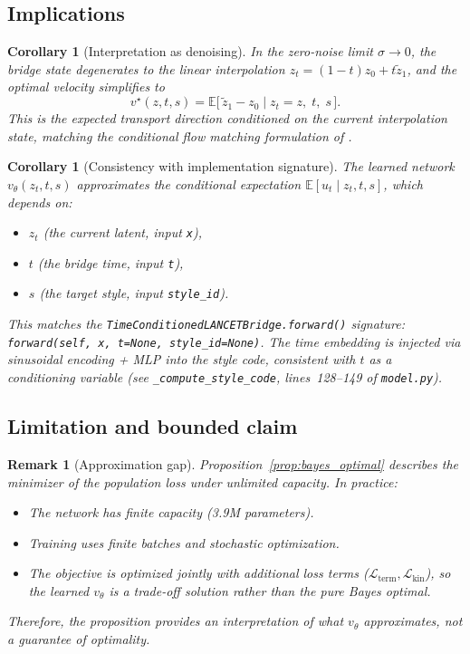 \documentclass[letterpaper]{article}
\newtheorem{corollary}[proposition]{Corollary}
\newtheorem{remark}[proposition]{Remark}
\newcommand{\E}{\mathbb{E}}
\newcommand{\cL}{\mathcal{L}}
\begin{document}
\subsection{Implications}

\begin{corollary}[Interpretation as denoising]
\label{cor:denoising}
In the zero-noise limit $\sigma \to 0$, the bridge state degenerates to
the linear interpolation $z_t = (1-t)z_0 + t\tilde z_1$, and the optimal
velocity simplifies to
\begin{equation}
    v^\star(z, t, s) = \E\bigl[\, \tilde z_1 - z_0 \mid z_t = z,\; t,\; s \,\bigr].
\end{equation}
This is the expected transport direction conditioned on the current
interpolation state, matching the conditional flow matching formulation
of \cite{lipman2022flow}.
\end{corollary}

\begin{corollary}[Consistency with implementation signature]
\label{cor:implementation}
The learned network $v_\theta(z_t, t, s)$ approximates the conditional
expectation $\E[u_t \mid z_t, t, s]$, which depends on:
\begin{itemize}[nosep]
    \item $z_t$ (the current latent, input \texttt{x}),
    \item $t$ (the bridge time, input \texttt{t}),
    \item $s$ (the target style, input \texttt{style\_id}).
\end{itemize}
This matches the \texttt{TimeConditionedLANCETBridge.forward()} signature:
\texttt{forward(self, x, t=None, style\_id=None)}.
The time embedding is injected via sinusoidal encoding + MLP into the
style code, consistent with $t$ as a conditioning variable (see
\texttt{\_compute\_style\_code}, lines~128--149 of \texttt{model.py}).
\end{corollary}

\subsection{Limitation and bounded claim}

\begin{remark}[Approximation gap]
Proposition~\ref{prop:bayes_optimal} describes the minimizer of the
population loss under unlimited capacity. In practice:
\begin{itemize}
    \item The network has finite capacity (3.9M parameters).
    \item Training uses finite batches and stochastic optimization.
    \item The objective is optimized jointly with additional loss terms
    ($\cL_{\text{term}}, \cL_{\text{kin}}$), so the learned $v_\theta$
    is a trade-off solution rather than the pure Bayes optimal.
\end{itemize}
Therefore, the proposition provides an \emph{interpretation} of what
$v_\theta$ approximates, not a guarantee of optimality.
\end{remark}
\end{document}
